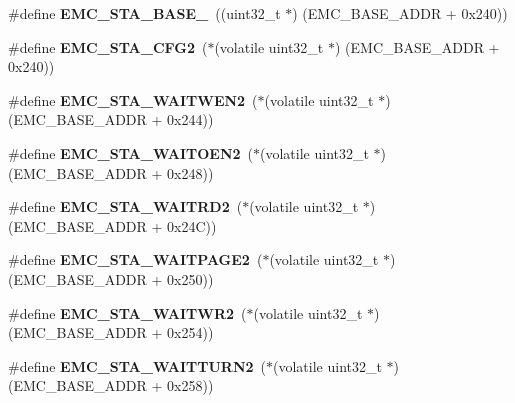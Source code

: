 \begin{DoxyCompactItemize}
\#define {\bfseries E\+M\+C\+\_\+\+S\+T\+A\+\_\+\+B\+A\+S\+E\+\_}~((uint32\+\_\+t $\ast$) (E\+M\+C\+\_\+\+B\+A\+S\+E\+\_\+\+A\+D\+DR + 0x240))
\item 
\mbox{\label{group__lpc24xx__regs_ga6bbcd624a457ea27c8a1a6a0b6eafdc0}} 
\#define {\bfseries E\+M\+C\+\_\+\+S\+T\+A\+\_\+\+C\+F\+G2}~($\ast$(volatile uint32\+\_\+t $\ast$) (E\+M\+C\+\_\+\+B\+A\+S\+E\+\_\+\+A\+D\+DR + 0x240))
\item 
\mbox{\label{group__lpc24xx__regs_gacce5de0c5f47da6df90b89f5bf407f75}} 
\#define {\bfseries E\+M\+C\+\_\+\+S\+T\+A\+\_\+\+W\+A\+I\+T\+W\+E\+N2}~($\ast$(volatile uint32\+\_\+t $\ast$) (E\+M\+C\+\_\+\+B\+A\+S\+E\+\_\+\+A\+D\+DR + 0x244))
\item 
\mbox{\label{group__lpc24xx__regs_ga65c69024df60132bb8d7866be8738f23}} 
\#define {\bfseries E\+M\+C\+\_\+\+S\+T\+A\+\_\+\+W\+A\+I\+T\+O\+E\+N2}~($\ast$(volatile uint32\+\_\+t $\ast$) (E\+M\+C\+\_\+\+B\+A\+S\+E\+\_\+\+A\+D\+DR + 0x248))
\item 
\mbox{\label{group__lpc24xx__regs_gada13bb6f1c3cd92ff28285c9004164f7}} 
\#define {\bfseries E\+M\+C\+\_\+\+S\+T\+A\+\_\+\+W\+A\+I\+T\+R\+D2}~($\ast$(volatile uint32\+\_\+t $\ast$) (E\+M\+C\+\_\+\+B\+A\+S\+E\+\_\+\+A\+D\+DR + 0x24\+C))
\item 
\mbox{\label{group__lpc24xx__regs_gaa8605aa063649e965eabb6af138c6a3b}} 
\#define {\bfseries E\+M\+C\+\_\+\+S\+T\+A\+\_\+\+W\+A\+I\+T\+P\+A\+G\+E2}~($\ast$(volatile uint32\+\_\+t $\ast$) (E\+M\+C\+\_\+\+B\+A\+S\+E\+\_\+\+A\+D\+DR + 0x250))
\item 
\mbox{\label{group__lpc24xx__regs_gac71482aafbb09e23724be7d37688e83d}} 
\#define {\bfseries E\+M\+C\+\_\+\+S\+T\+A\+\_\+\+W\+A\+I\+T\+W\+R2}~($\ast$(volatile uint32\+\_\+t $\ast$) (E\+M\+C\+\_\+\+B\+A\+S\+E\+\_\+\+A\+D\+DR + 0x254))
\item 
\mbox{\label{group__lpc24xx__regs_ga01ec470f6b7c9d62ab301f0636bae411}} 
\#define {\bfseries E\+M\+C\+\_\+\+S\+T\+A\+\_\+\+W\+A\+I\+T\+T\+U\+R\+N2}~($\ast$(volatile uint32\+\_\+t $\ast$) (E\+M\+C\+\_\+\+B\+A\+S\+E\+\_\+\+A\+D\+DR + 0x258))

\end{DoxyCompactItemize}
